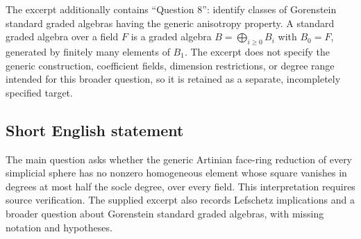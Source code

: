 \documentclass[11pt]{article}
\begin{document}
The excerpt additionally contains ``Question 8'': identify classes of Gorenstein standard graded algebras having the generic anisotropy property. A standard graded algebra over a field \(F\) is a graded algebra \(B=\bigoplus_{i\geq0}B_i\) with \(B_0=F\), generated by finitely many elements of \(B_1\). The excerpt does not specify the generic construction, coefficient fields, dimension restrictions, or degree range intended for this broader question, so it is retained as a separate, incompletely specified target.
\subsection{Short English statement}
The main question asks whether the generic Artinian face-ring reduction of every simplicial sphere has no nonzero homogeneous element whose square vanishes in degrees at most half the socle degree, over every field. This interpretation requires source verification. The supplied excerpt also records Lefschetz implications and a broader question about Gorenstein standard graded algebras, with missing notation and hypotheses.
\end{document}
